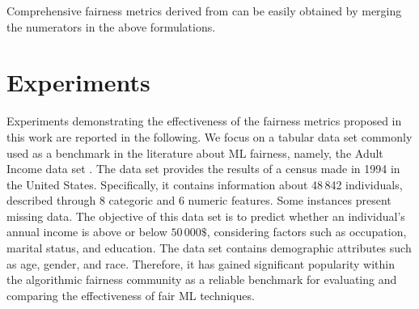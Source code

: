 \documentclass[letterpaper]{article} %
\begin{document}
\noindent Comprehensive fairness metrics derived from  can be easily obtained by merging the numerators in the above formulations.

\section{Experiments}

Experiments demonstrating the effectiveness of the fairness metrics proposed in this work are reported in the following.
%
We focus on a tabular data set commonly used as a benchmark in the literature about ML fairness, namely, the Adult Income data set \cite{Dua_2019}.
%
The data set provides the results of a census made in 1994 in the United States. Specifically, it contains information about 48\,842 individuals, described through 8 categoric and 6 numeric features. Some instances present missing data.
%
The objective of this data set is to predict whether an individual's annual income is above or below $50\,000\$$, considering factors such as occupation, marital status, and education. The data set contains demographic attributes such as age, gender, and race.
%
Therefore, it has gained significant popularity within the algorithmic fairness community as a reliable benchmark for evaluating and comparing the effectiveness of fair ML techniques.
%
\end{document}
